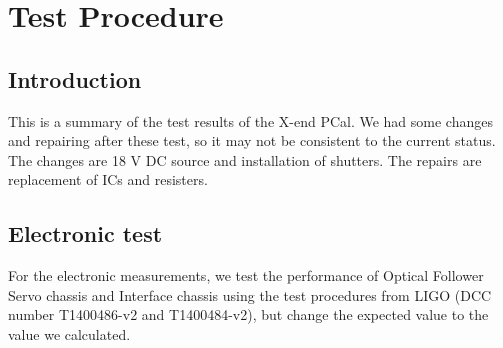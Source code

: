 
\chapter{Test Procedure} %

\label{Chapter1} %


\section{Introduction}
This is a summary of the test results of the X-end PCal. We had some changes and repairing after these test, so it may not be consistent to the current status. The changes are 18 V DC source and installation of shutters. The repairs are replacement of ICs and resisters. 
\section{Electronic test}
For the electronic measurements, we test the performance of Optical Follower Servo chassis and Interface chassis using the test procedures from LIGO (DCC number T1400486-v2 and T1400484-v2), but change the expected value to the value we calculated.
